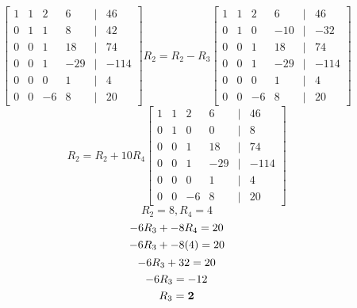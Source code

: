\documentclass[11pt]{article}
\begin{document}
\begin{enumerate}
\begin{enumerate}
\[\begin{bmatrix}
        1 & 1 & 2 & 6 &|& 46 \\
        0 & 1 & 1 & 8 &|& 42 \\
        0 & 0 & 1 & 18 &|& 74 \\
        0 & 0 & 1 & -29 &|& -114 \\
        0 & 0 & 0 & 1 &|& 4 \\
        0 & 0 & -6 & 8 &|& 20
    \end{bmatrix}
  R_2 = R_2 - R_3
    \begin{bmatrix}
        1 & 1 & 2 & 6 &|& 46 \\
        0 & 1 & 0 & -10 &|& -32 \\
        0 & 0 & 1 & 18 &|& 74 \\
        0 & 0 & 1 & -29 &|& -114 \\
        0 & 0 & 0 & 1 &|& 4 \\
        0 & 0 & -6 & 8 &|& 20
    \end{bmatrix}
\]
\[
    R_2 = R_2 + 10R_4
    \begin{bmatrix}
        1 & 1 & 2 & 6 &|& 46 \\
        0 & 1 & 0 & 0 &|& 8 \\
        0 & 0 & 1 & 18 &|& 74 \\
        0 & 0 & 1 & -29 &|& -114 \\
        0 & 0 & 0 & 1 &|& 4 \\
        0 & 0 & -6 & 8 &|& 20
    \end{bmatrix}
\]
\[
    R_2 = 8,  
    R_4 = 4
\]
\[
    -6R_3 + -8R_4 = 20\\
\]
\[
    -6R_3 + -8(4) = 20 \\
\]
\[
    -6R_3 + 32 = 20 \\
\]
\[
    -6R_3 = -12 \\
\]
\[
    R_3 = \textbf{2} \\
\]


\end{enumerate}
\end{enumerate}
\end{document}
